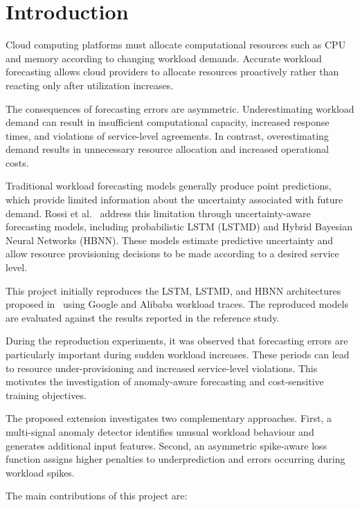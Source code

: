 \documentclass[conference]{IEEEtran}
\begin{document}
\section{Introduction}

Cloud computing platforms must allocate computational resources such as CPU and memory according to changing workload demands. Accurate workload forecasting allows cloud providers to allocate resources proactively rather than reacting only after utilization increases.

The consequences of forecasting errors are asymmetric. Underestimating workload demand can result in insufficient computational capacity, increased response times, and violations of service-level agreements. In contrast, overestimating demand results in unnecessary resource allocation and increased operational costs.

Traditional workload forecasting models generally produce point predictions, which provide limited information about the uncertainty associated with future demand. Rossi et al.~\cite{rossi2025} address this limitation through uncertainty-aware forecasting models, including probabilistic LSTM (LSTMD) and Hybrid Bayesian Neural Networks (HBNN). These models estimate predictive uncertainty and allow resource provisioning decisions to be made according to a desired service level.

This project initially reproduces the LSTM, LSTMD, and HBNN architectures proposed in~\cite{rossi2025} using Google and Alibaba workload traces. The reproduced models are evaluated against the results reported in the reference study.

During the reproduction experiments, it was observed that forecasting errors are particularly important during sudden workload increases. These periods can lead to resource under-provisioning and increased service-level violations. This motivates the investigation of anomaly-aware forecasting and cost-sensitive training objectives.

The proposed extension investigates two complementary approaches. First, a multi-signal anomaly detector identifies unusual workload behaviour and generates additional input features. Second, an asymmetric spike-aware loss function assigns higher penalties to underprediction and errors occurring during workload spikes.

The main contributions of this project are:
\end{document}
